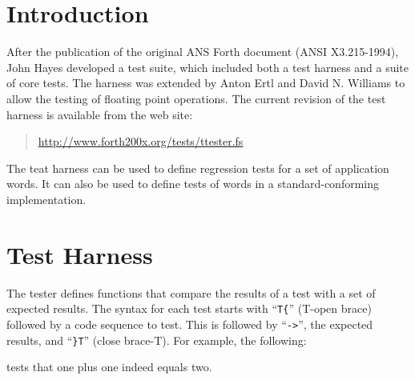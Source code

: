 \label{annex:test}

\section{Introduction} %
\label{test:intro}

\cbstart{}
After the publication of the original ANS Forth document
(ANSI X3.215-1994), John Hayes developed a test suite, which
included both a test harness and a suite of core tests.  The
harness was extended by Anton Ertl and David N. Williams to
allow the testing of floating point operations.
The current revision of the test harness is available from the
web site:
\begin{quote}
	\url{http://www.forth200x.org/tests/ttester.fs}
\end{quote}



The teat harness can be used to define regression tests for a set of
application words.  It can also be used to define tests of words in
a standard-conforming implementation.

\section{Test Harness}

The tester defines functions that compare the results of a test with
a set of expected results.  The syntax for each test starts with
``\texttt{T\{}'' (T-open brace) followed by a code sequence to test.
This is followed by ``\texttt{->}'', the expected results, and
``\texttt{\}T}'' (close brace-T).  For example, the following:
\begin{quote}
\end{quote}
tests that one plus one indeed equals two.

